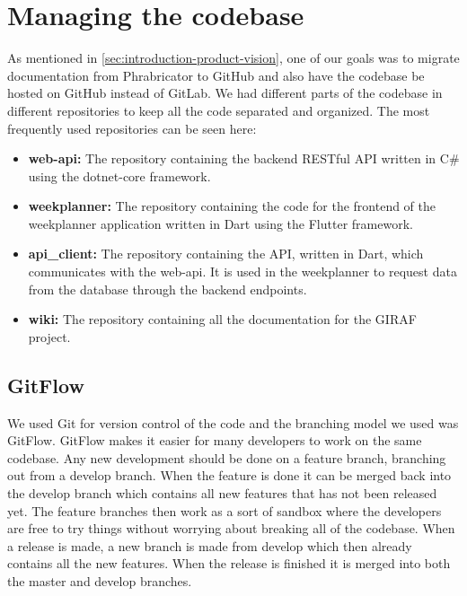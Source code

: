 \section{Managing the codebase}
As mentioned in \autoref{sec:introduction-product-vision}, one of our goals was to migrate documentation from Phrabricator to GitHub and also have the codebase be hosted on GitHub instead of GitLab. We had different parts of the codebase in different repositories to keep all the code separated and organized. The most frequently used repositories can be seen here:

\begin{itemize}
    \item \textbf{web-api:} The repository containing the backend RESTful API written in C\# using the dotnet-core framework.
    \item \textbf{weekplanner:} The repository containing the code for the frontend of the weekplanner application written in Dart using the Flutter framework. 
    \item \textbf{api\_client:} The repository containing the API, written in Dart, which communicates with the web-api. It is used in the weekplanner to request data from the database through the backend endpoints.
    \item \textbf{wiki:} The repository containing all the documentation for the GIRAF project. 
\end{itemize}

\subsection{GitFlow}
We used Git for version control of the code and the branching model we used was GitFlow. 
GitFlow makes it easier for many developers to work on the same codebase. 
Any new development should be done on a feature branch, branching out from a develop branch. 
When the feature is done it can be merged back into the develop branch which contains all new features that has not been released yet. 
The feature branches then work as a sort of sandbox where the developers are free to try things without worrying about breaking all of the codebase. 
When a release is made, a new branch is made from develop which then already contains all the new features. 
When the release is finished it is merged into both the master and develop branches.
